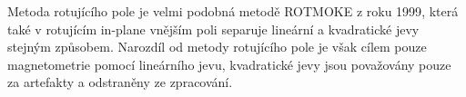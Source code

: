 Metoda rotujícího pole je velmi podobná metodě ROTMOKE z roku 1999\cite{ROTMOKE}, která také v rotujícím in-plane vnějším poli separuje lineární a kvadratické jevy stejným způsobem.
Narozdíl od metody rotujícího pole je však cílem pouze magnetometrie pomocí lineárního jevu, kvadratické jevy jsou považovány pouze za artefakty a odstraněny ze zpracování.
